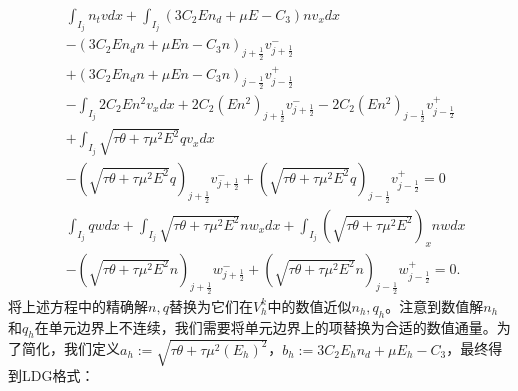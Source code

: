 \begin{align}
     & \int_{I_{j}} n_{t} v d x+\int_{I_{j}}\left(3 C_{2} E n_{d}+\mu E-C_{3}\right) n v_{x} d x                                                                          \nonumber                                              \\
     & -\left(3 C_{2} E n_{d} n+\mu E n-C_{3} n\right)_{j+\frac{1}{2}} v_{j+\frac{1}{2}}^{-}                                                                                       \nonumber                                     \\
     & +\left(3 C_{2} E n_{d} n+\mu E n-C_{3} n\right)_{j-\frac{1}{2}} v_{j-\frac{1}{2}}^{+}                                                                                      \nonumber                                      \\
     & -\int_{I_{j}} 2 C_{2} E n^{2} v_{x} d x+2 C_{2}\left(E n^{2}\right)_{j+\frac{1}{2}} v_{j+\frac{1}{2}}^{-}-2 C_{2}\left(E n^{2}\right)_{j-\frac{1}{2}} v_{j-\frac{1}{2}}^{+}           \nonumber                           \\
     & +\int_{I_{j}} \sqrt{\tau \theta+\tau \mu^{2} E^{2}} q v_{x} d x                                                                                               \nonumber                                                   \\
     & -\left(\sqrt{\tau \theta+\tau \mu^{2} E^{2}} q\right)_{j+\frac{1}{2}} v_{j+\frac{1}{2}}^{-}+\left(\sqrt{\tau \theta+\tau \mu^{2} E^{2}} q\right)_{j-\frac{1}{2}} v_{j-\frac{1}{2}}^{+}=0  \label{eq:HFRewrittenWeakForma} \\
     & \int_{I_{j}} q w d x+\int_{I_{j}} \sqrt{\tau \theta+\tau \mu^{2} E^{2}} n w_{x} d x+\int_{I_{j}}\left(\sqrt{\tau \theta+\tau \mu^{2} E^{2}}\right)_{x} n w d x    \nonumber                                               \\
     & -\left(\sqrt{\tau \theta+\tau \mu^{2} E^{2}} n\right)_{j+\frac{1}{2}} w_{j+\frac{1}{2}}^{-}+\left(\sqrt{\tau \theta+\tau \mu^{2} E^{2}} n\right)_{j-\frac{1}{2}} w_{j-\frac{1}{2}}^{+}=0 .\label{eq:HFRewrittenWeakFormb}
\end{align}
将上述方程中的精确解$n, q$替换为它们在$V_{h}^{k}$中的数值近似$n_h, q_h$。注意到数值解$n_h$和$q_h$在单元边界上不连续，我们需要将单元边界上的项替换为合适的数值通量。为了简化，我们定义$a_h:=\sqrt{\tau \theta+\tau \mu^{2}\left(E_h\right)^{2}}$，$b_h:=3 C_{2} E_h n_{d}+\mu E_h-C_{3}$，最终得到LDG格式：
